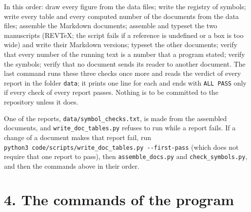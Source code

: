 \documentclass[
  10pt,
]{article}
\begin{document}
In this order: draw every figure from the data files; write the registry
of symbols; write every table and every computed number of the documents
from the data files; assemble the Markdown documents; assemble and
typeset the two manuscripts (REVTeX; the script fails if a reference is
undefined or a box is too wide) and write their Markdown versions;
typeset the other documents; verify that every number of the running
text is a number that a program stated; verify the symbols; verify that
no document sends its reader to another document. The last command runs
these three checks once more and reads the verdict of every report in
the folder \texttt{data}; it prints one line for each and ends with
\texttt{ALL\ PASS} only if every check of every report passes. Nothing
is to be committed to the repository unless it does.

One of the reports, \texttt{data/symbol\_checks.txt}, is made from the
assembled documents, and \texttt{write\_doc\_tables.py} refuses to run
while a report fails. If a change of a document makes that report fail,
run \texttt{python3\ code/scripts/write\_doc\_tables.py\ -\/-first-pass}
(which does not require that one report to pass), then
\texttt{assemble\_docs.py} and \texttt{check\_symbols.py}, and then the
commands above in their order.

\hypertarget{the-commands-of-the-program}{%
\section{4. The commands of the
program}\label{the-commands-of-the-program}}
\end{document}
